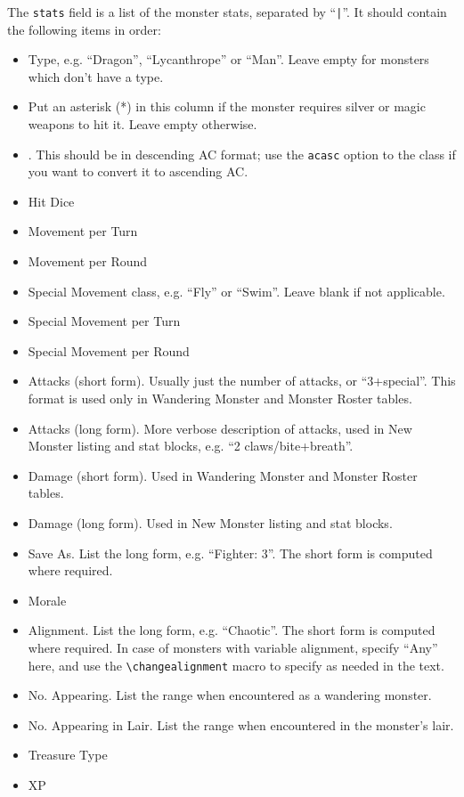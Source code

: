\documentclass[letterpaper,serif]{module}
\begin{document}
\noindent The \verb|stats| field is a list of the monster stats, separated by ``\verb:|:''. It should contain the following items in order:
\renewcommand{\labelitemi}{$\bullet$}
\begin{itemize}\setlength{\itemsep}{0pt}
\item Type, e.g. ``Dragon'', ``Lycanthrope'' or ``Man''. Leave empty for monsters which don't have a type.
\item Put an asterisk (*) in this column if the monster requires silver or magic weapons to hit it. Leave empty otherwise.
\item \ArmourClass. This should be in descending AC format; use the \verb|acasc| option to the class if you want to convert it to ascending AC.
\item Hit Dice
\item Movement per Turn
\item Movement per Round
\item Special Movement class, e.g. ``Fly'' or ``Swim''. Leave blank if not applicable.
\item Special Movement per Turn
\item Special Movement per Round
\item Attacks (short form). Usually just the number of attacks, or ``3+special''. This format is used only in Wandering Monster and Monster Roster tables.
\item Attacks (long form). More verbose description of attacks, used in New Monster listing and stat blocks, e.g. ``2 claws/bite+breath''.
\item Damage (short form). Used in Wandering Monster and Monster Roster tables.
\item Damage (long form). Used in New Monster listing and stat blocks.
\item Save As. List the long form, e.g. ``Fighter: 3''. The short form is computed where required.
\item Morale
\item Alignment. List the long form, e.g. ``Chaotic''. The short form is computed where required. In case of monsters with variable alignment, specify ``Any''
here, and use the \verb|\changealignment| macro to specify as needed in the text.
\item No. Appearing. List the range when encountered as a wandering monster.
\item No. Appearing in Lair. List the range when encountered in the monster's lair.
\item Treasure Type
\item XP
\end{itemize}
\end{document}

